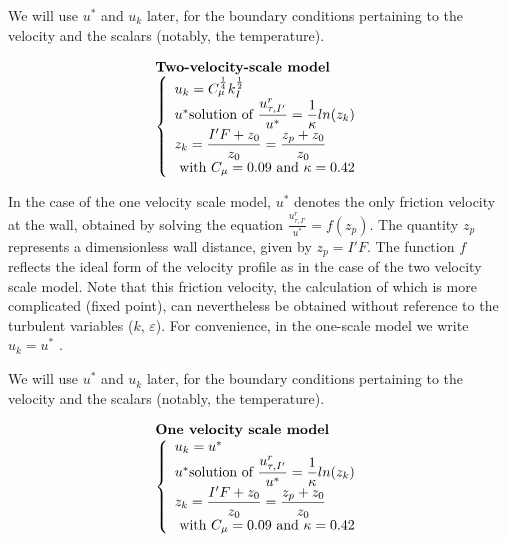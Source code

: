 We will use $u^*$ and $u_k$ later, for the boundary conditions pertaining to the velocity
and the scalars (notably, the temperature).


\begin{equation}
\label{Eq_Mod_'2ech_Vit}
\begin{array}{l}
\text{\bf Two-velocity-scale model}\\
\left\{\begin{array}{l}
u_k = C_\mu^\frac{1}{4}k_I^\frac{1}{2}\\
u^* \text{solution of }  \displaystyle\frac{u^r_{\tau,I'}}{u^*} =
\displaystyle\frac{1}{\kappa}ln(z_k)\\
z_k=\displaystyle\frac{I'F+z_0}{z_0} = \displaystyle\frac{z_p+z_0}{z_0}\\
\text{   with   } C_\mu =0.09 \text{  and }  \kappa = 0.42
\end{array}\right.\\
\end{array}
\end{equation}


\vspace{0.5cm}

In the case of the one velocity scale model, $u^*$ denotes the only friction velocity
at the wall, obtained by solving the equation $\displaystyle\frac{u^r_{\tau,I'}}{u^*} = f(z_p)$.
The quantity $z_p$  represents a dimensionless wall distance, given by $z_p=I'F$. The
function $f$ reflects the ideal form of the velocity profile as in the case of the two
velocity scale model. Note that this friction velocity, the calculation of which is more
complicated (fixed point), can nevertheless be obtained without reference to the turbulent
variables ($k$, $\varepsilon$). For convenience, in the one-scale model we write $u_k=u^*$ .

We will use $u^*$ and $u_k$ later, for the boundary conditions pertaining to the velocity
and the scalars (notably, the temperature).

\begin{equation}
\begin{array}{l}
\text{\bf One velocity scale model}\\
\left\{\begin{array}{l}
u_k = u^*\\
u^* \text{solution of }  \displaystyle\frac{u^r_{\tau,I'}}{u^*} =
\displaystyle\frac{1}{\kappa}ln(z_k)\\
z_k=\displaystyle\frac{I'F+z_0}{z_0} = \displaystyle\frac{z_p+z_0}{z_0}\\
\text{   with   } C_\mu =0.09 \text{  and }  \kappa = 0.42
\end{array}\right.\\
\end{array}
\end{equation}

